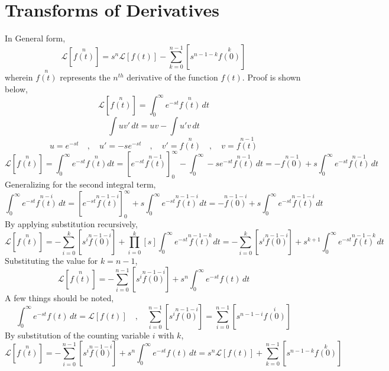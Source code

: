 \section{Transforms of Derivatives}
\begin{comment}
\end{comment}
In General form,
$$\mathcal{L}[\overset{n}{f(t)}] = s^n\mathcal{L}[f(t)] - \sum^{n - 1}_{k = 0}\left[s^{n - 1 - k}\overset{k}{f(0)}\right]$$
wherein $\overset{n}{f(t)}$ represents the $n^{th}$ derivative of the function $f(t)$. Proof is shown below,
$$\mathcal{L}[\overset{n}{f(t)}] = \int^{\infty}_{0}e^{-st}\overset{n}{f(t)}\,dt$$
$$\int uv' \,dt = uv - \int u'v \,dt$$
$$u = e^{-st}\quad,\quad u' = -se^{-st} \quad,\quad v' = \overset{n}{f(t)} \quad,\quad v = \overset{n-1}{f(t)}$$
$$\mathcal{L}[\overset{n}{f(t)}] = \int^{\infty}_{0}e^{-st}\overset{n}{f(t)}dt = \left[e^{-st}\overset{n-1}{f(t)}\right]^{\infty}_{0} - \int^{\infty}_{0}-se^{-st}\overset{n-1}{f(t)} \,dt = -\overset{n-1}{f(0)} + s\int^{\infty}_{0}e^{-st}\overset{n-1}{f(t)} \,dt $$
Generalizing for the second integral term,
$$\int^{\infty}_{0}e^{-st}\overset{n-i}{f(t)} \,dt = \left[e^{-st}\overset{n-1-i}{f(t)}\right]^{\infty}_{0} + s\int^{\infty}_{0}e^{-st}\overset{n-1-i}{f(t)} \,dt = -\overset{n-1-i}{f(0)} + s\int^{\infty}_{0}e^{-st}\overset{n-1-i}{f(t)} \,dt$$
By applying substitution recursively,
$$\mathcal{L}[\overset{n}{f(t)}] = -\sum^{k}_{i = 0}\left[s^i\overset{n-1-i}{f(0)}\right] + \prod^{k}_{i = 0}\left[s\right]\int^{\infty}_{0}e^{-st}\overset{n-1-k}{f(t)} \,dt = -\sum^{k}_{i = 0}\left[s^i\overset{n-1-i}{f(0)}\right] + s^{k + 1}\int^{\infty}_{0}e^{-st}\overset{n-1-k}{f(t)} \,dt$$
Substituting the value for $k = n-1$,
$$\mathcal{L}[\overset{n}{f(t)}] = -\sum^{n-1}_{i = 0}\left[s^i\overset{n-1-i}{f(0)}\right] + s^{n}\int^{\infty}_{0}e^{-st}f(t) \,dt$$
A few things should be noted,
$$\int^{\infty}_{0}e^{-st}f(t) \,dt = \mathcal{L}[f(t)]\quad,\quad \sum^{n-1}_{i = 0}\left[s^i\overset{n-1-i}{f(0)}\right] = \sum^{n-1}_{i = 0}\left[s^{n-1-i}\overset{i}{f(0)}\right]$$
By substitution of the counting variable $i$ with $k$,
$$\mathcal{L}[\overset{n}{f(t)}] = -\sum^{n-1}_{i = 0}\left[s^i\overset{n-1-i}{f(0)}\right] + s^{n}\int^{\infty}_{0}e^{-st}f(t) \,dt = s^n \mathcal{L}[f(t)] + \sum^{n-1}_{k = 0}\left[s^{n-1-k}\overset{k}{f(0)}\right]$$

